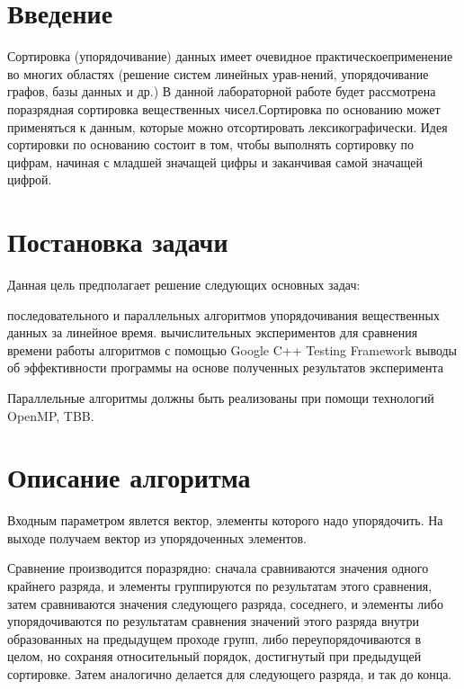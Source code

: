 \documentclass{report}
\begin{document}
\setcounter{page}{2}

\tableofcontents
\newpage

\section*{Введение}
\par Сортировка (упорядочивание) данных имеет очевидное практическоеприменение во многих областях (решение систем линейных урав-нений, упорядочивание графов, базы данных и др.) В данной лабораторной работе будет рассмотрена поразрядная сортировка вещественных чисел.Сортировка по основанию может применяться к данным, которые можно отсортировать лексикографически. Идея сортировки по основанию состоит в том, чтобы выполнять сортировку по цифрам, начиная с младшей значащей цифры и заканчивая самой значащей цифрой.
\newpage

\section*{Постановка задачи}
\par Данная цель предполагает решение следующих основных задач:
\begin{enumerate}
 последовательного и параллельных алгоритмов упорядочивания вещественных данных за линейное время. 
 вычислительных экспериментов для сравнения времени работы алгоритмов с помощью Google C++ Testing Framework
 выводы об эффективности программы на основе полученных результатов эксперимента

 
\end{enumerate}
\par Параллельные алгоритмы должны быть реализованы при помощи технологий OpenMP, TBB.
\newpage

\section*{Описание алгоритма}
Входным параметром явлется вектор, элементы которого надо упорядочить. На выходе получаем вектор из упорядоченных элементов.\par
Сравнение производится поразрядно: сначала сравниваются значения одного крайнего разряда, и элементы группируются по результатам этого сравнения, затем сравниваются значения следующего разряда, соседнего, и элементы либо упорядочиваются по результатам сравнения значений этого разряда внутри образованных на предыдущем проходе групп, либо переупорядочиваются в целом, но сохраняя относительный порядок, достигнутый при предыдущей сортировке. Затем аналогично делается для следующего разряда, и так до конца.
\end{document}
